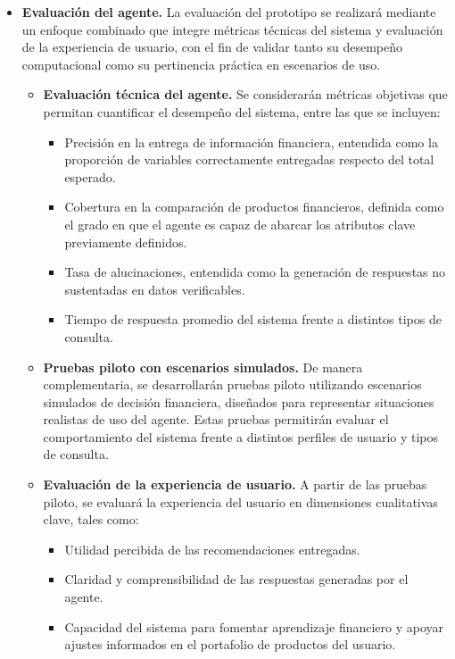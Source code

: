 \documentclass[
	spanish, %
	letterpaper, oneside
]{book}
\begin{document}
\begin{itemize}
    \item \textbf{Evaluación del agente.}  
La evaluación del prototipo se realizará mediante un enfoque combinado que integre métricas técnicas del sistema y evaluación de la experiencia de usuario, con el fin de validar tanto su desempeño computacional como su pertinencia práctica en escenarios de uso.

\begin{itemize}
    \item \textbf{Evaluación técnica del agente.}  
    Se considerarán métricas objetivas que permitan cuantificar el desempeño del sistema, entre las que se incluyen:
    \begin{itemize}
        \item Precisión en la entrega de información financiera, entendida como la proporción de variables correctamente entregadas respecto del total esperado.
        \item Cobertura en la comparación de productos financieros, definida como el grado en que el agente es capaz de abarcar los atributos clave previamente definidos.
        \item Tasa de alucinaciones, entendida como la generación de respuestas no sustentadas en datos verificables.
        \item Tiempo de respuesta promedio del sistema frente a distintos tipos de consulta.
    \end{itemize}
    
    \item \textbf{Pruebas piloto con escenarios simulados.}  
    De manera complementaria, se desarrollarán pruebas piloto utilizando escenarios simulados de decisión financiera, diseñados para representar situaciones realistas de uso del agente. Estas pruebas permitirán evaluar el comportamiento del sistema frente a distintos perfiles de usuario y tipos de consulta.
    
    \item \textbf{Evaluación de la experiencia de usuario.}  
    A partir de las pruebas piloto, se evaluará la experiencia del usuario en dimensiones cualitativas clave, tales como:
    \begin{itemize}
        \item Utilidad percibida de las recomendaciones entregadas.
        \item Claridad y comprensibilidad de las respuestas generadas por el agente.
        \item Capacidad del sistema para fomentar aprendizaje financiero y apoyar ajustes informados en el portafolio de productos del usuario.
    \end{itemize}
\end{itemize}



\end{itemize}
\end{document}
